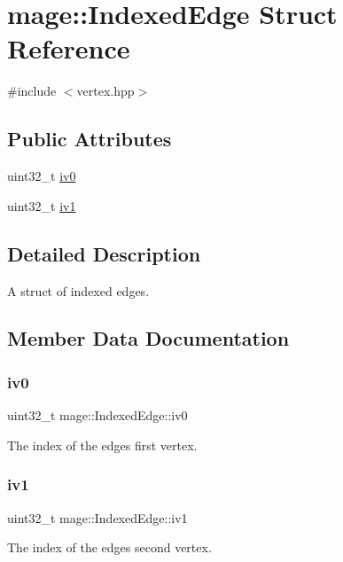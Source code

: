 \hypertarget{structmage_1_1_indexed_edge}{}\section{mage\+:\+:Indexed\+Edge Struct Reference}
\label{structmage_1_1_indexed_edge}


{\ttfamily \#include $<$vertex.\+hpp$>$}

\subsection*{Public Attributes}
\begin{DoxyCompactItemize}
\item 
uint32\+\_\+t \hyperlink{structmage_1_1_indexed_edge_a2d9717dccad8876af7492f0952cf7097}{iv0}
\item 
uint32\+\_\+t \hyperlink{structmage_1_1_indexed_edge_ad01e125a7beee86ea885625e9db9b8d7}{iv1}
\end{DoxyCompactItemize}


\subsection{Detailed Description}
A struct of indexed edges. 

\subsection{Member Data Documentation}
\hypertarget{structmage_1_1_indexed_edge_a2d9717dccad8876af7492f0952cf7097}{}\label{structmage_1_1_indexed_edge_a2d9717dccad8876af7492f0952cf7097} 
\subsubsection{\texorpdfstring{iv0}{iv0}}
{\footnotesize\ttfamily uint32\+\_\+t mage\+::\+Indexed\+Edge\+::iv0}

The index of the edge\textquotesingle{}s first vertex. \hypertarget{structmage_1_1_indexed_edge_ad01e125a7beee86ea885625e9db9b8d7}{}\label{structmage_1_1_indexed_edge_ad01e125a7beee86ea885625e9db9b8d7} 
\subsubsection{\texorpdfstring{iv1}{iv1}}
{\footnotesize\ttfamily uint32\+\_\+t mage\+::\+Indexed\+Edge\+::iv1}

The index of the edge\textquotesingle{}s second vertex. 